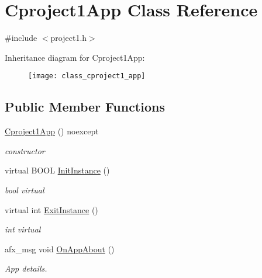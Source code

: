 \hypertarget{class_cproject1_app}{}\section{Cproject1\+App Class Reference}
\label{class_cproject1_app}


{\ttfamily \#include $<$project1.\+h$>$}

Inheritance diagram for Cproject1\+App\+:\begin{figure}[H]
\begin{center}
\leavevmode
\texttt{[image: class\_cproject1\_app]}
\end{center}
\end{figure}
\subsection*{Public Member Functions}
\begin{DoxyCompactItemize}
\item 
\mbox{\label{class_cproject1_app_a2fbeb34bf62f8ad88f2486abda547aff}} 
\mbox{\hyperlink{class_cproject1_app_a2fbeb34bf62f8ad88f2486abda547aff}{Cproject1\+App}} () noexcept
\begin{DoxyCompactList}\small\item\em constructor \end{DoxyCompactList}\item 
virtual B\+O\+OL \mbox{\hyperlink{class_cproject1_app_ace47920b20e0bf1d79d42b1ce03025ba}{Init\+Instance}} ()
\begin{DoxyCompactList}\small\item\em bool virtual \end{DoxyCompactList}\item 
virtual int \mbox{\hyperlink{class_cproject1_app_a56e9ef8e5859a07840d9a9e90ca329b0}{Exit\+Instance}} ()
\begin{DoxyCompactList}\small\item\em int virtual \end{DoxyCompactList}\item 
\mbox{\label{class_cproject1_app_ae20e674993ffb19a73a311f852de01be}} 
afx\+\_\+msg void \mbox{\hyperlink{class_cproject1_app_ae20e674993ffb19a73a311f852de01be}{On\+App\+About}} ()
\begin{DoxyCompactList}\small\item\em App details. \end{DoxyCompactList}\end{DoxyCompactItemize}


